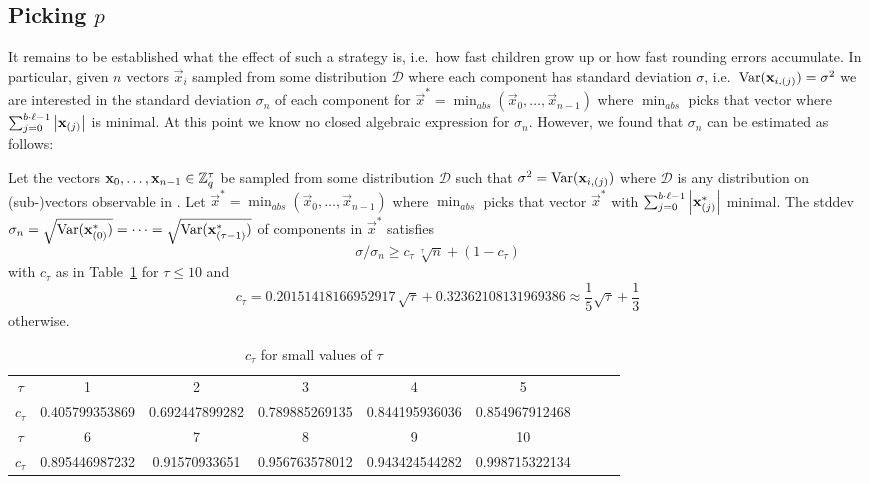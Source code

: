 \subsection{Picking $p$}
It remains to be established what the effect of such a strategy is, i.e.\ how fast children grow up or how fast rounding errors accumulate. 
In particular, given $n$ vectors $\vec{x}_i$ sampled from some distribution $\mathcal{D}$ where each component has standard deviation 
$\sigma$, i.e.\ $\textnormal{Var}(\mathbf{x}_{i,(j)}) = \sigma^2$ we are interested in the standard deviation $\sigma_{n}$ of each component for 
$\vec{x}^* = \min_{abs}\left(\vec{x}_0,\dots,\vec{x}_{n-1}\right)$ where $\min_{abs}$ picks that vector where 
$\sum_{j=0}^{b\cdot\ell-1} \left|\mathbf{x}_{(j)}\right|$ is minimal. At this point we know no closed algebraic expression for $\sigma_n$. However, we found that $\sigma_n$ can be estimated as follows:
\begin{assumption}
\label{ass:minvar}
Let the vectors $\mathbf{x}_0,\ldots,\mathbf{x}_{n-1} \in \mathbb{Z}_q^{\tau}$ be sampled from some distribution $\mathcal{D}$ such that $\sigma^2 = \textnormal{Var}(\mathbf{x}_{i,(j)})$ where $\mathcal{D}$ is any distribution on (sub-)vectors observable in . Let $\vec{x}^*=\min_{abs}\left(\vec{x}_0,\dots,\vec{x}_{n-1}\right)$ where $\min_{abs}$ picks that vector $\vec{x}^*$ with 
$\sum_{j=0}^{b\cdot\ell-1} \left|\mathbf{x}^*_{(j)}\right|$ minimal. The stddev $\sigma_{n} = \sqrt{\textnormal{Var}(\mathbf{x}^*_{(0)})} =\cdots=\sqrt{\textnormal{Var}(\mathbf{x}^*_{(\tau-1)})}$ of components in $\vec{x}^*$ satisfies
$$\sigma/\sigma_n \geq c_\tau\, \sqrt[\tau]{n} + (1 - c_\tau)$$ with $c_\tau$ as in Table~\ref{tab:ctau} for $\tau \leq 10$ and 
$$c_\tau = 0.20151418166952917\,\sqrt{\tau}  + 0.32362108131969386\approx \frac{1}{5}\sqrt{\tau} + \frac{1}{3}$$
otherwise. 
\end{assumption}

\begin{table}
\centering\begin{footnotesize}
\begin{tabular}{|c|c|c|c|c|c|c|c|c|}
\hline
$\tau$    &         1  &         2  &         3  &         4  &         5\\
$c_\tau$  & 0.405799353869 & 0.692447899282 & 0.789885269135 & 0.844195936036 & 0.854967912468\\
\hline
$\tau$    &         6  &         7  &         8  &         9  &        10 \\
$c_\tau$  & 0.895446987232 & 0.91570933651 & 0.956763578012 & 0.943424544282 & 0.998715322134\\
\hline
\end{tabular}
\end{footnotesize}
\caption{$c_\tau$ for small values of $\tau$}
\label{tab:ctau}
\end{table}

